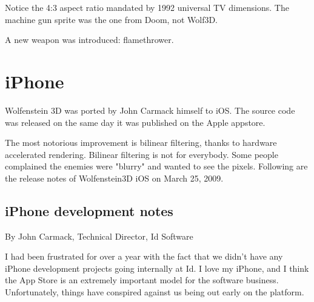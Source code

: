 \documentclass[book.tex]{subfiles}
\begin{document}
\par
\begin{figure}[H]
\centering
\end{figure}
\par
\begin{figure}[H]
\centering
\end{figure}
\par
Notice the 4:3 aspect ratio mandated by 1992 universal TV dimensions. The machine gun sprite was the one from Doom, not Wolf3D.
\begin{figure}[H]
\centering
\end{figure}
A new weapon was introduced: flamethrower.



\section{iPhone}
Wolfenstein 3D was ported by John Carmack himself to iOS. The source code was released on the same day it was published on the Apple appstore.
    \par
\begin{figure}[H]
\centering
 \end{figure}
 \par
 The most notorious improvement is bilinear filtering, thanks to hardware accelerated rendering. Bilinear filtering is not for everybody. Some people complained the enemies were "blurry" and wanted to see the pixels. Following are the release notes of Wolfenstein3D iOS on March 25, 2009.

\subsection{iPhone development notes}

By John Carmack, Technical Director, Id Software\\
\par

I had been frustrated for over a year with the fact that we didn't have any iPhone development projects going internally at Id.  I love my iPhone, and I think the App Store is an extremely important model for the software business.  Unfortunately, things have conspired against us being out early on the platform.\\
\par
\end{document}
